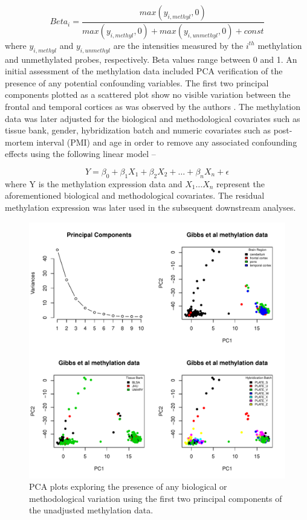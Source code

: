\documentclass[hidelinks]{article}
\begin{document}
\begin{equation*}
Beta_i = \frac{ max(y_{i,methyl},0) }{max(y_{i,methyl},0) + max(y_{i,unmethyl},0) + const}
\end{equation*}
where $y_{i,methyl}$ and $y_{i,unmethyl}$ are the intensities measured by the $i^{th}$ methylation and unmethylated probes, respectively. Beta values range between 0 and 1. An initial assessment of the methylation data included PCA verification of the presence of any potential confounding variables. The first two principal components plotted as a scattered plot show no visible variation between the frontal and temporal cortices as was observed by the authors \cite{gibbs}. The methylation data was later adjusted for the biological and methodological covariates such as tissue bank, gender, hybridization batch and numeric covariates such as post-mortem interval (PMI) and age in order to remove any associated confounding effects using the following linear model --

\begin{equation*}
Y = \beta_0 + \beta_1 X_1 + \beta_2 X_2 + \ldots + \beta_n X_n + \epsilon
\end{equation*}
where Y is the methylation expression data and $X_1 \ldots X_n$ represent the aforementioned biological and methodological covariates. The residual methylation expression was later used in the subsequent downstream analyses. 

\begin{center}
\begin{figure}[!ht]
\includegraphics[width=\textwidth]{pca_meth_exp.pdf}
\caption[PCA plots of the methylation data]{PCA plots exploring the presence of any biological or methodological variation using the first two principal components of the unadjusted methylation data.}
\end{figure}
\end{center}
\end{document}
